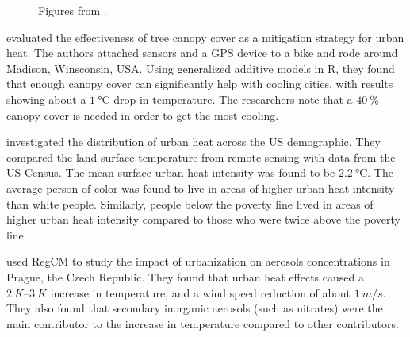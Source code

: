 		\begin{figure}
			\centering
			\hfill
			
			\caption{Figures from \textcite{Karlicky2018}.}
			\label{fig:rrl-karlicky2018}
		\end{figure}
		
		\textcite{Ziter2019} evaluated the effectiveness of tree canopy cover as a mitigation strategy for urban heat.
		The authors attached sensors and a GPS device to a bike and rode around Madison, Winsconsin, USA.
		Using generalized additive models in R, they found that enough canopy cover can significantly help with cooling cities, 
			with results showing about a $\qty{1}{\degreeCelsius}$ drop in temperature.
		The researchers note that a $\qty{40}{\percent}$ canopy cover is needed in order to get the most cooling.
		
		\textcite{Hsu2021} investigated the distribution of urban heat across the US demographic. 
		They compared the land surface temperature from remote sensing with data from the US Census.
		The mean surface urban heat intensity was found to be $\qty{2.2}{\degreeCelsius}$.
		The average person-of-color was found to live in areas of higher urban heat intensity than white people.
		Similarly, people below the poverty line lived in areas of higher urban heat intensity compared to those who were twice above the poverty line.
		
		\textcite{Huszar2018} used RegCM to study the impact of urbanization on aerosols concentrations in Prague, the Czech Republic.
		They found that urban heat effects caused a $\qtyrange{2}{3}{K}$ increase in temperature, and a wind speed reduction of about $\qty{1}{m/s}$.
		They also found that secondary inorganic aerosols (such as nitrates) were the main contributor to the increase in temperature compared to other contributors.
		

